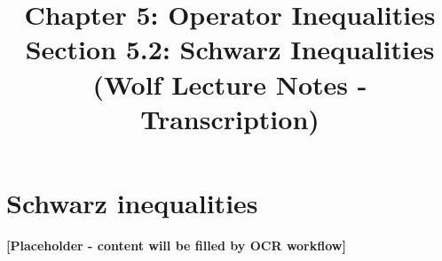 \documentclass{article}
\title{Chapter 5: Operator Inequalities \\ {\large Section 5.2: Schwarz Inequalities} \\ {\small (Wolf Lecture Notes - Transcription)}}
\author{}
\date{}
\theoremstyle{plain}
\theoremstyle{definition}
\theoremstyle{remark}
\begin{document}
\maketitle

\tableofcontents

\section{Schwarz inequalities} \label{sec:schwarz}

%
%
%
%
%
%
%

\textbf{[Placeholder - content will be filled by OCR workflow]}
\end{document}
